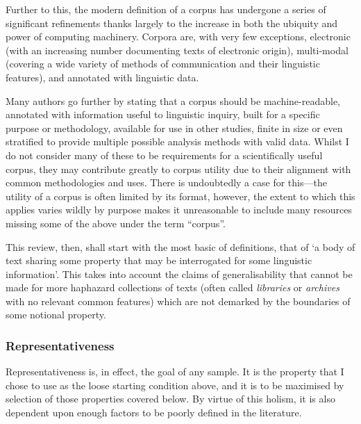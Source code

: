 
Further to this, the modern definition of a corpus has undergone a series of significant refinements thanks largely to the increase in both the ubiquity and power of computing machinery.  Corpora are, with very few exceptions, electronic (with an increasing number documenting texts of electronic origin), multi-modal (covering a wide variety of methods of communication and their linguistic features), and annotated with linguistic data.

Many authors go further by stating that a corpus should be machine-readable, annotated with information useful to linguistic inquiry, built for a specific purpose or methodology, available for use in other studies, finite in size or even stratified to provide multiple possible analysis methods with valid data.  Whilst I do not consider many of these to be requirements for a scientifically useful corpus, they may contribute greatly to corpus utility due to their alignment with common methodologies and uses.  There is undoubtedly a case for this---the utility of a corpus is often limited by its format, however, the extent to which this applies varies wildly by purpose makes it unreasonable to include many resources missing some of the above under the term ``corpus''.



This review, then, shall start with the most basic of definitions, that of `a body of text sharing some property that may be interrogated for some linguistic information'.  This takes into account the claims of generalisability that cannot be made for more haphazard collections of texts (often called \textsl{libraries} or \textsl{archives} with no relevant common features) which are not demarked by the boundaries of some notional property.










\subsubsection{Representativeness} %
Representativeness is, in effect, the goal of any sample.  It is the property that I chose to use as the loose starting condition above, and it is to be maximised by selection of those properties covered below.  By virtue of this holism, it is also dependent upon enough factors to be poorly defined in the literature.

